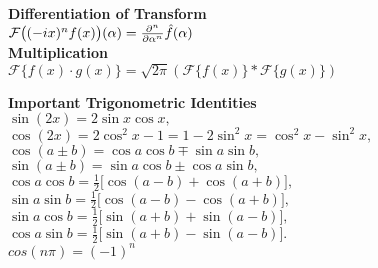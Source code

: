 \documentclass[8pt]{article}
\begin{document}
\begin{multicols}{2}
\begin{minipage}[htp]{0.55\textwidth}
\begin{multicols}{2}
			\textbf{Differentiation of Transform} \\[2pt]
			$
				\mathcal{F}\big((-ix)^n f(x)\big)(\alpha) = \frac{\partial^n}{\partial \alpha^n} \hat{f}(\alpha) \\[4pt]
			$\\
			\textbf{Multiplication} \\
			$
				\mathcal{F}\{f(x) \cdot g(x)\} = \sqrt{2\pi}\left( \mathcal{F}\{f(x)\} * \mathcal{F}\{g(x)\} \right)
			$ \\[4pt]
		\end{multicols}
	\end{minipage}
	\normalsize
	\noindent \textbf{Important Trigonometric Identities} \\[2pt]
	$\sin(2x) = 2\sin x\cos x,$ \\[3pt]
	$\cos(2x) = 2\cos^2 x - 1 = 1 - 2\sin^2 x = \cos^2 x - \sin^2 x,$ \\[3pt]
	$\cos(a \pm b) = \cos a\cos b \mp \sin a\sin b,$ \\[3pt]
	$\sin(a \pm b) = \sin a\cos b \pm \cos a\sin b,$ \\[3pt]
	$\cos a\cos b = \tfrac{1}{2}\bigl[\cos(a - b) + \cos(a + b)\bigr],$ \\[3pt]
	$\sin a\sin b = \tfrac{1}{2}\bigl[\cos(a - b) - \cos(a + b)\bigr],$ \\[3pt]
	$\sin a\cos b = \tfrac{1}{2}\bigl[\sin(a + b) + \sin(a - b)\bigr],$ \\[3pt]
	$\cos a\sin b = \tfrac{1}{2}\bigl[\sin(a + b) - \sin(a - b)\bigr].$\\[3pt]
	$cos(n \pi) = (-1)^n$
	\normalsize
\end{multicols}
\endgroup
\end{document}
